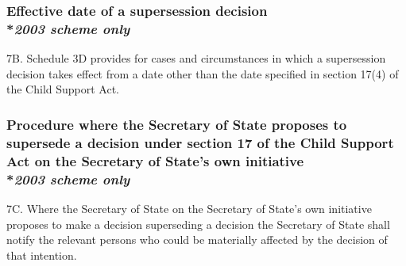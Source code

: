 \documentclass[12pt,a4paper]{article}
\begin{document}
\subsubsection[7B. Effective date of a supersession decision]{Effective date of a supersession decision\\*\emph{2003 scheme only}}

7B.  Schedule 3D provides for cases and circumstances in which a supersession decision takes effect from a date other than the date specified in section 17(4) of the Child Support   Act.


\subsubsection[7C. Procedure where the 
Secretary of State  %
proposes to supersede a decision under section 17 of the Child Support Act on 
the Secretary of State's  %
own initiative]{Procedure where the 
Secretary of State  %
proposes to supersede a decision under section 17 of the Child Support Act on 
the Secretary of State's  %
own initiative\\*\emph{2003 scheme only}}

7C.  Where the 
Secretary of State  %
on 
the Secretary of State's  %
own initiative proposes to make a decision superseding a decision 
the Secretary of State  %
shall notify the relevant persons who could be materially affected by the decision of that intention.
\end{document}
